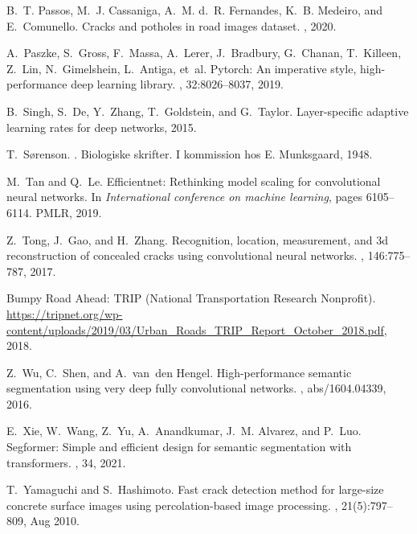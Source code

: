 \documentclass[twocolumn]{article}
\begin{document}
\begin{thebibliography}{10}
B.~T. Passos, M.~J. Cassaniga, A.~M. d.~R. Fernandes, K.~B. Medeiro, and
  E.~Comunello.
\newblock Cracks and potholes in road images dataset.
, 2020.

A.~Paszke, S.~Gross, F.~Massa, A.~Lerer, J.~Bradbury, G.~Chanan, T.~Killeen,
  Z.~Lin, N.~Gimelshein, L.~Antiga, et~al.
\newblock Pytorch: An imperative style, high-performance deep learning library.
,
  32:8026--8037, 2019.

B.~Singh, S.~De, Y.~Zhang, T.~Goldstein, and G.~Taylor.
\newblock Layer-specific adaptive learning rates for deep networks, 2015.

T.~S{\o}renson.
.
\newblock Biologiske skrifter. I kommission hos E. Munksgaard, 1948.

M.~Tan and Q.~Le.
\newblock Efficientnet: Rethinking model scaling for convolutional neural
  networks.
\newblock In {\em International conference on machine learning}, pages
  6105--6114. PMLR, 2019.

Z.~Tong, J.~Gao, and H.~Zhang.
\newblock Recognition, location, measurement, and 3d reconstruction of
  concealed cracks using convolutional neural networks.
, 146:775--787, 2017.

{Bumpy Road Ahead: TRIP (National Transportation Research Nonprofit)}.
\newblock
  \url{https://tripnet.org/wp-content/uploads/2019/03/Urban_Roads_TRIP_Report_October_2018.pdf},
  2018.

Z.~Wu, C.~Shen, and A.~van~den Hengel.
\newblock High-performance semantic segmentation using very deep fully
  convolutional networks.
, abs/1604.04339, 2016.

E.~Xie, W.~Wang, Z.~Yu, A.~Anandkumar, J.~M. Alvarez, and P.~Luo.
\newblock Segformer: Simple and efficient design for semantic segmentation with
  transformers.
, 34, 2021.

T.~Yamaguchi and S.~Hashimoto.
\newblock Fast crack detection method for large-size concrete surface images
  using percolation-based image processing.
, 21(5):797--809, Aug 2010.


\end{thebibliography}
\end{document}

